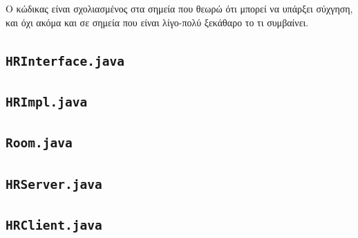 \documentclass{article}
\begin{document}
Ο κώδικας είναι σχολιασμένος στα σημεία που θεωρώ ότι μπορεί να υπάρξει
σύχγηση, και όχι ακόμα και σε σημεία που είναι λίγο-πολύ ξεκάθαρο το τι
συμβαίνει.

\subsection{\lstinline{HRInterface.java}}


\pagebreak

\subsection{\lstinline{HRImpl.java}}


\pagebreak

\subsection{\lstinline{Room.java}}


\pagebreak

\subsection{\lstinline{HRServer.java}}


\pagebreak

\subsection{\lstinline{HRClient.java}}


\pagebreak
\end{document}

